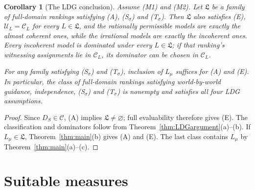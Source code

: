 \documentclass[11pt]{article}
\newtheorem{corollary}[theorem]{Corollary}
\theoremstyle{definition}
\newcommand{\C}{\mathcal C}
\newcommand{\U}{\mathcal U}
\newcommand{\Lf}{\mathfrak L}
\newcommand{\Lmu}{L_\mu}
\begin{document}
\begin{corollary}[The LDG conclusion]\label{cor:argument}
Assume (M1) and (M2). Let $\Lf$ be a family of full-domain rankings satisfying (A), (S$_\sigma$) and (T$_\sigma$). Then $\Lf$ also satisfies (E), $\U_L=\C_L$ for every $L\in\Lf$, and the rationally permissible models are exactly the almost coherent ones, while the irrational models are exactly the incoherent ones. Every incoherent model is dominated under every $L\in\Lf$; if that ranking's witnessing assignments lie in $\C_L$, its dominator can be chosen in $\C_L$.

For any family satisfying (S$_\sigma$) and (T$_\sigma$), inclusion of $\Lmu$ suffices for (A) and (E). In particular, the class of full-domain rankings satisfying world-by-world guidance, independence, (S$_\sigma$) and (T$_\sigma$) is nonempty and satisfies all four LDG assumptions.
\end{corollary}
\begin{proof}
Since $D_S\in\C$, (A) implies $\Lf\ne\varnothing$; full evaluability therefore gives (E). The classification and dominators follow from Theorem~\ref{thm:LDGargument}(a)--(b). If $\Lmu\in\Lf$, Theorem~\ref{thm:main}(b) gives (A) and (E). The last class contains $\Lmu$ by Theorem~\ref{thm:main}(a)--(c).
\end{proof}

\section{Suitable measures}\label{sec:measures}
\end{document}
